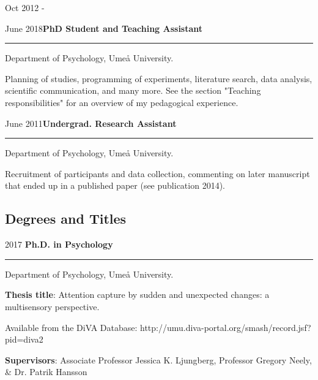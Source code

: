 \documentclass[]{article}
\begin{document}
Oct 2012 -

June
2018\hspace{0.75cm}\textbf{PhD Student and Teaching Assistant}\vspace{1mm}

\hrule
\begin{changemargin}{2.3cm}{2.4cm}

Department of Psychology, Umeå University.

Planning of studies, programming of experiments, literature search, data analysis, scientific communication, and many more. See the section "Teaching responsibilities" for an overview of my pedagogical experience.

\end{changemargin}

June
2011\hspace{0.75cm}\textbf{Undergrad. Research Assistant}\vspace{1mm}

\hrule
\begin{changemargin}{2.3cm}{2.4cm}

Department of Psychology, Umeå University.

Recruitment of participants and data collection, commenting on later manuscript that ended up in a published paper (see publication 2014). 

\end{changemargin}

\newpage

\hypertarget{degrees-and-titles}{%
\subsection{Degrees and Titles}\label{degrees-and-titles}}

2017 \hspace{1.5cm} \textbf{Ph.D. in Psychology}\vspace{1mm}

\hrule

\begin{changemargin}{2.3cm}{2.4cm}

Department of Psychology, Umeå University.

\textbf{Thesis title}: Attention capture by sudden and unexpected changes: a multisensory perspective. 

Available from the DiVA Database: \sloppy http://umu.diva-portal.org/smash/record.jsf?pid=diva2%

\textbf{Supervisors}: Associate Professor Jessica K. Ljungberg, Professor Gregory Neely, \& Dr. Patrik Hansson
\end{changemargin}
\end{document}
